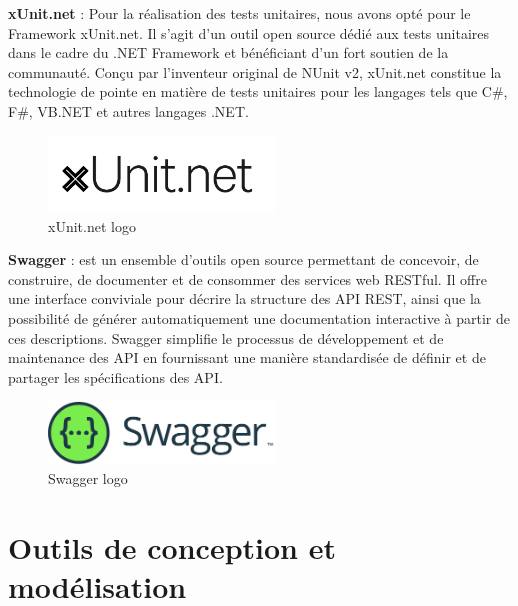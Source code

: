 \textbf{xUnit.net} : Pour la réalisation des tests unitaires, nous avons opté pour le Framework xUnit.net. Il s'agit d'un outil open source dédié aux tests unitaires dans le cadre du .NET Framework et bénéficiant d'un fort soutien de la communauté. Conçu par l'inventeur original de NUnit v2, xUnit.net constitue la technologie de pointe en matière de tests unitaires pour les langages tels que C\#, F\#, VB.NET et autres langages .NET.
\\
\begin{figure}[H]
    \centering
    \includegraphics[width=6cm]{Figures/xunitlogo.png}
    \caption{xUnit.net logo}
\end{figure}


\textbf{Swagger} : est un ensemble d'outils open source permettant de concevoir, de construire, de documenter et de consommer des services web RESTful. Il offre une interface conviviale pour décrire la structure des API REST, ainsi que la possibilité de générer automatiquement une documentation interactive à partir de ces descriptions. Swagger simplifie le processus de développement et de maintenance des API en fournissant une manière standardisée de définir et de partager les spécifications des API.
\\
\begin{figure}[H]
    \centering
    \includegraphics[width=6cm]{Figures/swaggerlogo.png}
    \caption{Swagger logo}
\end{figure}



\section{Outils de conception et modélisation}


